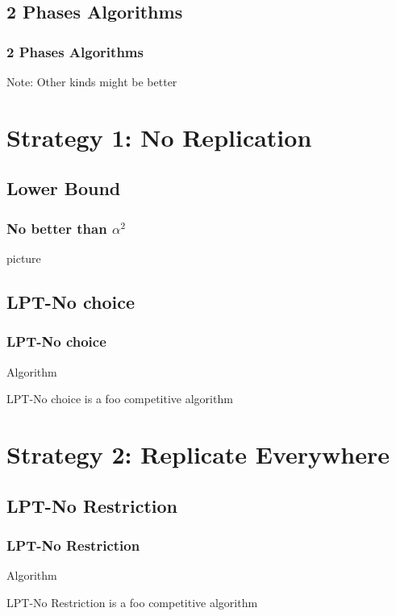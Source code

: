 \documentclass[usenames,dvipsnames]{beamer}
\begin{document}
\subsection{2 Phases Algorithms}

\begin{frame}
  \frametitle{2 Phases Algorithms}


  Note: Other kinds might be better
\end{frame}


\section{Strategy 1: No Replication}

\subsection{Lower Bound}

\begin{frame}
  \frametitle{No better than $\alpha^2$}

  picture
\end{frame}

\subsection{LPT-No choice}

\begin{frame}
  \frametitle{LPT-No choice}

  \begin{block}{Algorithm}
  \end{block}

  \begin{block}{LPT-No choice is a foo competitive algorithm}
  \end{block}
\end{frame}

\section{Strategy 2: Replicate Everywhere}

\subsection{LPT-No Restriction}

\begin{frame}
  \frametitle{LPT-No Restriction}

  \begin{block}{Algorithm}
  \end{block}
  
  \begin{block}{LPT-No Restriction is a foo competitive algorithm}
  \end{block}  
\end{frame}
\end{document}
